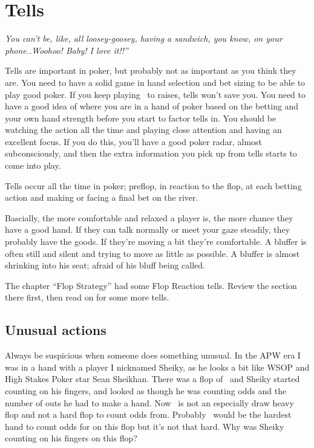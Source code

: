 \chapter{Tells}

\textit{You can't be, like,  all loosey-goosey, having a sandwich,
you know, on your phone..Woohoo! Baby! I love it!!''}


Tells are important in poker, but probably not as important as you think
they are. You need to have a solid game in hand selection and bet sizing
to be able to play good poker. If you keep playing \Jh\sixc\ to
raises, tells won't save you. You need to have a good idea of where
you are in a hand of poker based on the betting and your own hand
strength before you start to factor tells in. You should be watching
the action all the time and playing close attention and having an
excellent focus. If you do this, you'll have a good poker radar,
almost subconsciously, and then the extra information you pick up from
tells starts to come into play.

Tells occur all the time in poker; preflop, in reaction to the flop,
at each betting action and making or facing a final bet on the river.

Bascially, the more comfortable and relaxed a player is, the more
chance they have a good hand. If they can talk normally or meet your
gaze steadily, they probably have the goods. If they're moving a bit
they're comfortable. A bluffer is often still and silent and trying to
move as little as possible. A bluffer is almost shrinking into his
seat; afraid of his bluff being called.

The chapter ``Flop Strategy'' had some Flop Reaction tells. 
Review the section there first, then read on for some more tells.

\section{Unusual actions}

Always be suspicious when someone does something unusual.
In the APW era I was in a hand with a player I nicknamed Sheiky, as
he looks a bit like WSOP and High Stakes Poker star Sean Sheikhan.
There was a flop of \Kc\nined\sevd\, and Sheiky started counting on his
fingers, and looked as though he was counting odds and the number
of outs he had to make a hand. Now \Kc\nined\sevd\ is not an especially
draw heavy flop and not a hard flop to count odds from. Probably
\Qd\tens\ would be the hardest hand to count odds for on this flop but
it's not that hard. Why was Sheiky counting on his fingers on this
flop?


